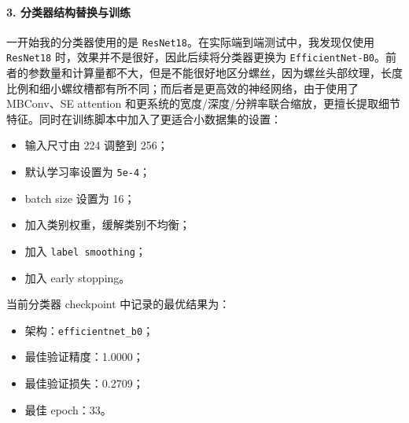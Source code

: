 \documentclass[12pt,a4paper]{ctexart}
\begin{document}
\paragraph{3. 分类器结构替换与训练}
一开始我的分类器使用的是 \texttt{ResNet18}。在实际端到端测试中，我发现仅使用 \texttt{ResNet18} 时，效果并不是很好，因此后续将分类器更换为 \texttt{EfficientNet-B0}。前者的参数量和计算量都不大，但是不能很好地区分螺丝，因为螺丝头部纹理，长度比例和细小螺纹槽都有所不同；而后者是更高效的神经网络，由于使用了MBConv、SE attention 和更系统的宽度/深度/分辨率联合缩放，更擅长提取细节特征。同时在训练脚本中加入了更适合小数据集的设置：
\begin{itemize}
    \item 输入尺寸由 224 调整到 256；
    \item 默认学习率设置为 \texttt{5e-4}；
    \item batch size 设置为 16；
    \item 加入类别权重，缓解类别不均衡；
    \item 加入 \texttt{label smoothing}；
    \item 加入 early stopping。
\end{itemize}

当前分类器 checkpoint 中记录的最优结果为：
\begin{itemize}
    \item 架构：\texttt{efficientnet\_b0}；
    \item 最佳验证精度：1.0000；
    \item 最佳验证损失：0.2709；
    \item 最佳 epoch：33。
\end{itemize}
\end{document}
